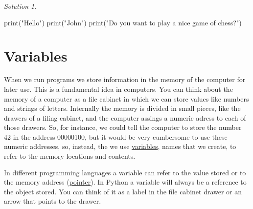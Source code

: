 \documentclass[
  letterpaper,
  DIV=11,
  numbers=noendperiod]{scrreprt}
\newenvironment{Shaded}{\begin{snugshade}}{\end{snugshade}}
\newcommand{\BuiltInTok}[1]{\textcolor[rgb]{0.00,0.23,0.31}{#1}}
\newcommand{\NormalTok}[1]{\textcolor[rgb]{0.00,0.23,0.31}{#1}}
\newcommand{\StringTok}[1]{\textcolor[rgb]{0.13,0.47,0.30}{#1}}
\theoremstyle{remark}
\newtheorem*{solution}{Solution}
\begin{document}
\begin{solution}
\leavevmode

\begin{tcolorbox}[enhanced jigsaw, opacityback=0, colframe=quarto-callout-tip-color-frame, breakable, colback=white, colbacktitle=quarto-callout-tip-color!10!white, titlerule=0mm, left=2mm, toprule=.15mm, coltitle=black, opacitybacktitle=0.6, bottomrule=.15mm, arc=.35mm, leftrule=.75mm, bottomtitle=1mm, toptitle=1mm, rightrule=.15mm, title=\textcolor{quarto-callout-tip-color}{\faLightbulb}\hspace{0.5em}{Tip}]

\begin{Shaded}
\begin{Highlighting}[]
\BuiltInTok{print}\NormalTok{(}\StringTok{"Hello"}\NormalTok{)}
\BuiltInTok{print}\NormalTok{(}\StringTok{"John"}\NormalTok{)}
\BuiltInTok{print}\NormalTok{(}\StringTok{"Do you want to play a nice game of chess?"}\NormalTok{)}
\end{Highlighting}
\end{Shaded}

\end{tcolorbox}

\end{solution}

\section{Variables}\label{variables}

When we run programs we store information in the memory of the computer
for later use. This is a fundamental idea in computers. You can think
about the memory of a computer as a file cabinet in which we can store
values like numbers and strings of letters. Internally the memory is
divided in small pieces, like the drawers of a filing cabinet, and the
computer assings a numeric adress to each of those drawers. So, for
instance, we could tell the computer to store the number 42 in the
address 00000100, but it would be very cumbersome to use these numeric
addresses, so, instead, the we use
\href{https://en.wikipedia.org/wiki/Variable_(computer_science)}{variables},
names that we create, to refer to the memory locations and contents.

In different programming languages a variable can refer to the value
stored or to the memory address
(\href{https://en.wikipedia.org/wiki/Pointer_(computer_programming)}{pointer}).
In Python a variable will always be a reference to the object stored.
You can think of it as a label in the file cabinet drawer or an arrow
that points to the drawer.
\end{document}
